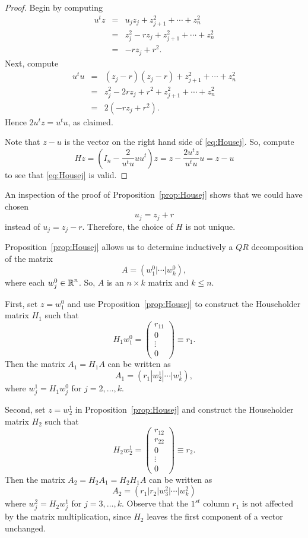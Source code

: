 \documentclass{ximera}
\begin{document}
\begin{proof}  Begin by computing
\begin{eqnarray*}
u^t z &=& u_j z_j + z_{j+1}^2 + \cdots + z_n^2 \\
& = & z_j^2 -rz_j +  z_{j+1}^2 + \cdots + z_n^2 \\
& = &  - rz_j + r^2.
\end{eqnarray*}
Next, compute
\begin{eqnarray*}
u^t u & = &  (z_j-r)(z_j-r) + z_{j+1}^2 + \cdots + z_n^2 \\
& = &  z_j^2 - 2rz_j + r^2 +  z_{j+1}^2 + \cdots + z_n^2 \\
& = & 2(-rz_j + r^2).
\end{eqnarray*}
Hence $2u^tz = u^t u$, as claimed.

Note that $z-u$ is the vector on the right hand side of \eqref{eq:Housej}.
So, compute
\[
Hz = \left(I_n - \frac{2}{u^tu} u u^t\right)z = z -\frac{2u^t z}{u^tu} u = z-u
\]
to see that \eqref{eq:Housej} is valid.  \end{proof}

An inspection of the proof of Proposition~\ref{prop:Housej} shows that we
could have chosen
\[
u_j = z_j + r
\]
instead of $u_j=z_j - r$.  Therefore, the choice of $H$ is not unique.

Proposition~\ref{prop:Housej} allows us to determine inductively a $QR$
decomposition of the matrix
\[
A=(w_1^0|\cdots|w_k^0),
\]
where each $w_j^0\in\mbox{$\Bbb{R}$}^n$.  So, $A$ is an $n\times k$ matrix and $k\leq n$.

First, set $z = w_1^0$ and use Proposition~\ref{prop:Housej} to construct the
Householder matrix $H_1$ such that
\[
H_1 w_1^0 =\left(\begin{array}{c} r_{11}\\ 0 \\ \vdots\\ 0 \end{array}\right)
\equiv r_1.
\]
Then the matrix $A_1=H_1A$ can be written as
\[
A_1=(r_1|w_2^1|\cdots|w_k^1),
\]
where $w_j^1=H_1w_j^0$ for $j=2,\ldots,k$.

Second, set $z=w_2^1$ in Proposition~\ref{prop:Housej} and construct the
Householder matrix $H_2$ such that
\[
H_2 w_2^1 =\left(\begin{array}{c} r_{12}\\ r_{22}\\ 0 \\ \vdots\\ 0
\end{array}\right) \equiv r_2.
\]
Then the matrix $A_2=H_2A_1=H_2H_1A$ can be written as
\[
A_2=(r_1|r_2|w_3^2|\cdots|w_k^2)
\]
where $w_j^2=H_2w_j^1$ for $j=3,\ldots,k$. Observe that the $1^{st}$ column
$r_1$ is not affected by the matrix multiplication, since $H_2$ leaves the
first component of a vector unchanged.
\end{document}
